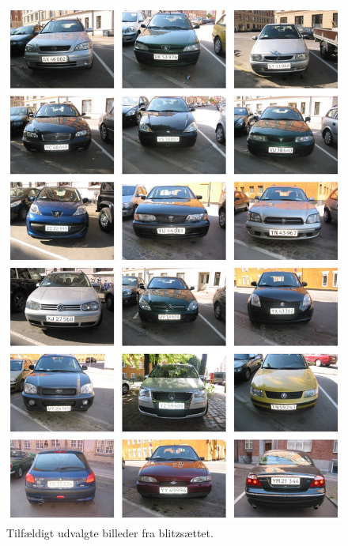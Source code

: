 \documentclass[11pt,a4paper,final]{article}
\begin{document}
\begin{figure}[htp]
\centering
\includegraphics[width=12cm]{appendix/illu/blitzset.jpg} 
\caption{Tilfældigt udvalgte billeder fra blitzsættet.}
\label{fig:illu:blitzset}
\end{figure}
\end{document}
